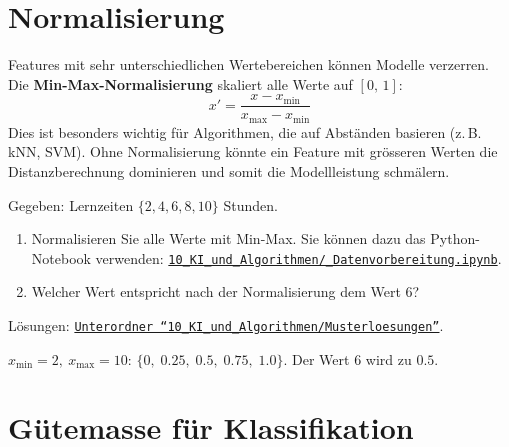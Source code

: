\section{Normalisierung}

\begin{mydefinition}
    Features mit sehr unterschiedlichen Wertebereichen können Modelle verzerren.
    Die \textbf{Min-Max-Normalisierung} skaliert alle Werte auf $[0,\,1]$:
    \[
        x' = \frac{x - x_{\min}}{x_{\max} - x_{\min}}
    \]
    Dies ist besonders wichtig für Algorithmen, die auf Abständen basieren (z.\,B. kNN, SVM). Ohne Normalisierung könnte ein Feature mit grösseren Werten die Distanzberechnung dominieren und somit die Modellleistung schmälern.
\end{mydefinition}

\begin{myexercise}
    Gegeben: Lernzeiten $\{2, 4, 6, 8, 10\}$ Stunden.
    \begin{enumerate}
        \item Normalisieren Sie alle Werte mit Min-Max. Sie können dazu das Python-Notebook verwenden: \href{\notebookurl}{\texttt{10\_KI\_und\_Algorithmen/\_Datenvorbereitung.ipynb}}.
        \item Welcher Wert entspricht nach der Normalisierung dem Wert 6?
    \end{enumerate}
    \begin{myanswer}
        Lösungen: \href{\notebookurl}{\texttt{Unterordner \enquote{10\_KI\_und\_Algorithmen/Musterloesungen}}}.

        $x_{\min}=2,\ x_{\max}=10$:
        $\{0,\; 0.25,\; 0.5,\; 0.75,\; 1.0\}$.
        Der Wert 6 wird zu $0.5$.
    \end{myanswer}
\end{myexercise}

\section{Gütemasse für Klassifikation}

